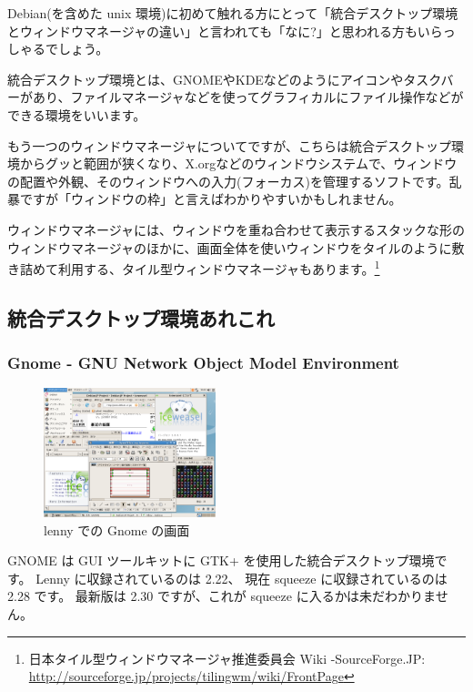 \documentclass[mingoth,a4paper]{jsarticle}
\begin{document}
Debian(を含めた unix 環境)に初めて触れる方にとって「統合デスクトップ環境とウィンドウマネージャの違い」と言われても「なに?」と思われる方もいらっしゃるでしょう。

統合デスクトップ環境とは、GNOMEやKDEなどのようにアイコンやタスクバーがあり、ファイルマネージャなどを使ってグラフィカルにファイル操作などができる環境をいいます。

もう一つのウィンドウマネージャについてですが、こちらは統合デスクトップ環境からグッと範囲が狭くなり、X.orgなどのウィンドウシステムで、ウィンドウの配置や外観、そのウィンドウへの入力(フォーカス)を管理するソフトです。乱暴ですが「ウィンドウの枠」と言えばわかりやすいかもしれません。

ウィンドウマネージャには、ウィンドウを重ね合わせて表示するスタックな形のウィンドウマネージャのほかに、画面全体を使いウィンドウをタイルのように敷き詰めて利用する、タイル型ウィンドウマネージャもあります。\footnote{%
日本タイル型ウィンドウマネージャ推進委員会 Wiki -SourceForge.JP:\\
\url{http://sourceforge.jp/projects/tilingwm/wiki/FrontPage}}

\subsection{統合デスクトップ環境あれこれ}

\subsubsection{Gnome - GNU Network Object Model Environment}
\begin{figure}
 \begin{center}
  \includegraphics[width=5cm]{image201004/gnome.png}
  \caption{lenny での Gnome の画面}
 \end{center}
\end{figure}


GNOME は GUI ツールキットに GTK+ を使用した統合デスクトップ環境です。
Lenny に収録されているのは 2.22、
現在 squeeze に収録されているのは 2.28 です。
最新版は 2.30 ですが、これが squeeze に入るかは未だわかりません。
\end{document}
